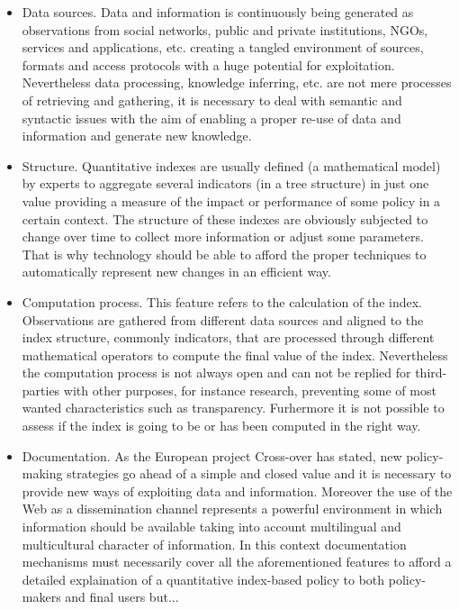 \documentclass{llncs}
\begin{document}
\begin{itemize}
 \item Data sources. Data and information is continuously being generated as observations from social networks, public and private institutions, NGOs, services and applications, etc. 
 creating a tangled environment of sources, formats and access protocols with a huge potential for exploitation. Nevertheless data processing, knowledge inferring, etc. are not mere processes 
 of retrieving and gathering, it is necessary to deal with semantic and syntactic issues with the aim of enabling a proper re-use of data and information 
 and generate new knowledge. 
 
 \item Structure. Quantitative indexes are usually defined (a mathematical model) by experts to aggregate several indicators (in a tree structure) in just one value providing 
 a measure of the impact or performance of some policy in a certain context. The structure of these indexes are obviously subjected to change over time 
 to collect more information or adjust some parameters. That is why technology should be able to afford the proper techniques 
 to automatically represent new changes in an efficient way.
 
  \item Computation process. This feature refers to the calculation of the index. Observations are gathered from different data sources and aligned 
  to the index structure, commonly indicators, that are processed through different mathematical operators to compute the final value of the index. 
  Nevertheless the computation process is not always open and can not be replied for third-parties with other purposes, for instance research, preventing some 
  of most wanted characteristics such as transparency. Furhermore it is not possible to assess if the index is going to be or has been computed in 
  the right way.
  
  \item Documentation. As the European project Cross-over has stated, new policy-making strategies go ahead of a simple and closed value and it is necessary to provide 
  new ways of exploiting data and information. Moreover the use of the Web as a dissemination channel represents a powerful environment in which 
  information should be available taking into account multilingual and multicultural character of information. In this context documentation mechanisms 
  must necessarily cover all the aforementioned features to afford a detailed explaination of a quantitative index-based policy to both policy-makers 
  and final users but...
\end{itemize}
\end{document}
